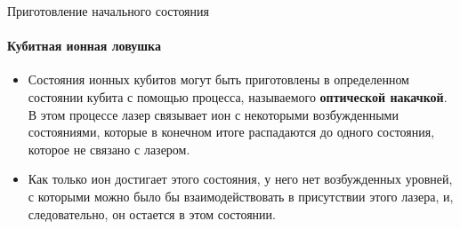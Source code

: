 \documentclass{beamer}
\begin{document}
    \begin{frame}{Приготовление начального состояния}
    \framesubtitle{Кубитная ионная ловушка}

    \begin{itemize}
            \item <1-> Состояния ионных кубитов могут быть приготовлены в определенном состоянии кубита с помощью процесса, называемого \textbf{оптической накачкой}. В этом процессе лазер связывает ион с некоторыми возбужденными состояниями, которые в конечном итоге распадаются до одного состояния, которое не связано с лазером.
            \item <2-> Как только ион достигает этого состояния, у него нет возбужденных уровней, с которыми можно было бы взаимодействовать в присутствии этого лазера, и, следовательно, он остается в этом состоянии.
    \end{itemize}


    \end{frame}
\end{document}

